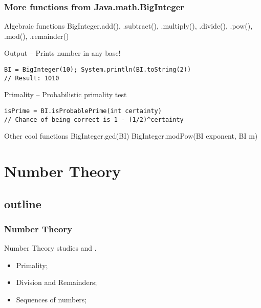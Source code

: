 \documentclass{beamer}
\begin{document}
\begin{frame}[fragile]
  \frametitle{More functions from Java.math.BigInteger}
{\smaller
  
  \begin{block}{Algebraic functions}
    BigInteger.add(), .subtract(), .multiply(), .divide(),
    .pow(), .mod(), .remainder()
  \end{block}

  \begin{block}{Output -- Prints number in any base!}
\begin{verbatim}
BI = BigInteger(10); System.println(BI.toString(2))
// Result: 1010
\end{verbatim}    
  \end{block}

  \begin{block}{Primality -- Probabilistic primality test}
\begin{verbatim}
isPrime = BI.isProbablePrime(int certainty)
// Chance of being correct is 1 - (1/2)^certainty
\end{verbatim}
  \end{block}


\begin{block}{Other cool functions}
  BigInteger.gcd(BI)
  BigInteger.modPow(BI exponent, BI m)
\end{block}}
\end{frame}


\section{Number Theory}
\subsection{outline}
\begin{frame}
  \frametitle{Number Theory} {\small 

    Number Theory studies  and
    .

    \bigskip
    
    \begin{itemize}
    \item Primality;
    \item Division and Remainders;
    \item Sequences of numbers;
    \end{itemize}

    }
\end{frame}
\end{document}
